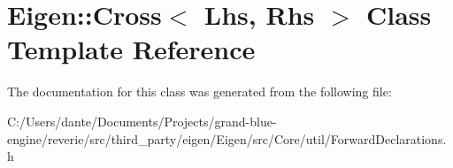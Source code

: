 \hypertarget{class_eigen_1_1_cross}{}\section{Eigen\+::Cross$<$ Lhs, Rhs $>$ Class Template Reference}
\label{class_eigen_1_1_cross}


The documentation for this class was generated from the following file\+:\begin{DoxyCompactItemize}
\item 
C\+:/\+Users/dante/\+Documents/\+Projects/grand-\/blue-\/engine/reverie/src/third\+\_\+party/eigen/\+Eigen/src/\+Core/util/Forward\+Declarations.\+h\end{DoxyCompactItemize}
